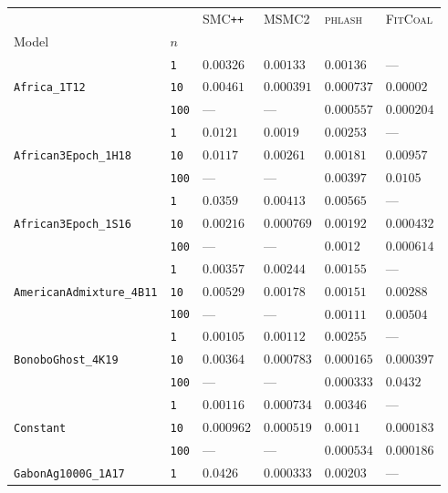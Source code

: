 \begin{footnotesize}
\begin{tabular}{llllll}
\toprule
 &  & \textsc{SMC}\texttt{{++}} & \textsc{MSMC2} & \textsc{phlash} & \textsc{FitCoal} \\
Model & $n$ &  &  &  &  \\
\midrule
\multirow[c]{3}{*}{\texttt{Africa\_1T12}} & \texttt{1} & $0.00326$ & $0.00133$ & $0.00136$ & --- \\
 & \texttt{10} & $0.00461$ & $0.000391$ & $0.000737$ & $0.00002$ \\
 & \texttt{100} & --- & --- & $0.000557$ & $0.000204$ \\
\cline{1-6}
\multirow[c]{3}{*}{\texttt{African3Epoch\_1H18}} & \texttt{1} & $0.0121$ & $0.0019$ & $0.00253$ & --- \\
 & \texttt{10} & $0.0117$ & $0.00261$ & $0.00181$ & $0.00957$ \\
 & \texttt{100} & --- & --- & $0.00397$ & $0.0105$ \\
\cline{1-6}
\multirow[c]{3}{*}{\texttt{African3Epoch\_1S16}} & \texttt{1} & $0.0359$ & $0.00413$ & $0.00565$ & --- \\
 & \texttt{10} & $0.00216$ & $0.000769$ & $0.00192$ & $0.000432$ \\
 & \texttt{100} & --- & --- & $0.0012$ & $0.000614$ \\
\cline{1-6}
\multirow[c]{3}{*}{\texttt{AmericanAdmixture\_4B11}} & \texttt{1} & $0.00357$ & $0.00244$ & $0.00155$ & --- \\
 & \texttt{10} & $0.00529$ & $0.00178$ & $0.00151$ & $0.00288$ \\
 & \texttt{100} & --- & --- & $0.00111$ & $0.00504$ \\
\cline{1-6}
\multirow[c]{3}{*}{\texttt{BonoboGhost\_4K19}} & \texttt{1} & $0.00105$ & $0.00112$ & $0.00255$ & --- \\
 & \texttt{10} & $0.00364$ & $0.000783$ & $0.000165$ & $0.000397$ \\
 & \texttt{100} & --- & --- & $0.000333$ & $0.0432$ \\
\cline{1-6}
\multirow[c]{3}{*}{\texttt{Constant}} & \texttt{1} & $0.00116$ & $0.000734$ & $0.00346$ & --- \\
 & \texttt{10} & $0.000962$ & $0.000519$ & $0.0011$ & $0.000183$ \\
 & \texttt{100} & --- & --- & $0.000534$ & $0.000186$ \\
\cline{1-6}
\multirow[c]{3}{*}{\texttt{GabonAg1000G\_1A17}} & \texttt{1} & $0.0426$ & $0.000333$ & $0.00203$ & --- \\

\end{tabular}
\end{footnotesize}
